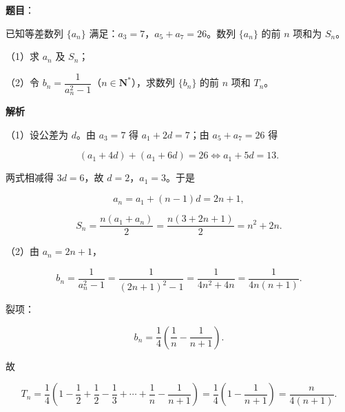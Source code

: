 \begin{answer}

\textbf{题目}：

已知等差数列 $\{a_n\}$ 满足：$a_3=7$，$a_5+a_7=26$。数列 $\{a_n\}$ 的前 $n$ 项和为 $S_n$。

（1）求 $a_n$ 及 $S_n$；

（2）令 $b_n=\dfrac1{a_n^2-1}$（$n\in\mathbf N^*$），求数列 $\{b_n\}$ 的前 $n$ 项和 $T_n$。

\textbf{解析}

（1）设公差为 $d$。由 $a_3=7$ 得 $a_1+2d=7$；由 $a_5+a_7=26$ 得

\nopagebreak[4]
\[(a_1+4d)+(a_1+6d)=26\iff a_1+5d=13.\]

两式相减得 $3d=6$，故 $d=2$，$a_1=3$。于是

\nopagebreak[4]
\[a_n=a_1+(n-1)d=2n+1,\]

\nopagebreak[4]
\[S_n=\frac{n(a_1+a_n)}2=\frac{n(3+2n+1)}2=n^2+2n.\]

（2）由 $a_n=2n+1$，

\nopagebreak[4]
\[b_n=\frac1{a_n^2-1}=\frac1{(2n+1)^2-1}
=\frac1{4n^2+4n}=\frac1{4n(n+1)}.\]

裂项：

\nopagebreak[4]
\[b_n=\frac14\left(\frac1n-\frac1{n+1}\right).\]

故

\nopagebreak[4]
\[T_n=\frac14\left(1-\frac12+\frac12-\frac13+\cdots+\frac1n-\frac1{n+1}\right)
=\frac14\left(1-\frac1{n+1}\right)
=\frac{n}{4(n+1)}.\]


\end{answer}
